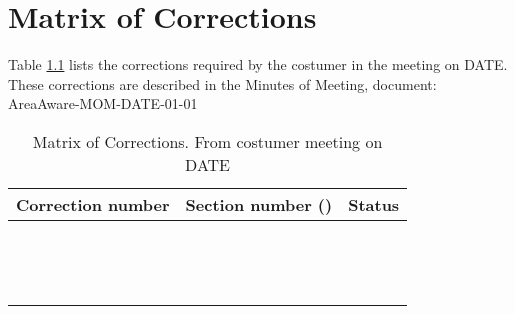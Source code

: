\chapter{Matrix of Corrections}
\label{chp:matrix}

Table \ref{tb:MoC} lists the corrections required by the costumer in the meeting on DATE. These corrections are described in the Minutes of Meeting, document: AreaAware-MOM-DATE-01-01\\

\begin{table}[ht]
\centering
\begin{tabular}{|c|c|c|}
\hline Correction number & Section number () & Status \\ 
\hline  &  &  \\ 
\hline  &  &  \\ 
\hline  &  &  \\ 
\hline  &  &  \\ 
\hline  &  &  \\ 
\hline  &  &  \\ 
\hline  &  &  \\ 
\hline  &  &  \\ 
\hline  &  &  \\ 
\hline  &  &  \\ 
\hline  &  &  \\ 
\hline  &  &  \\ 
\hline  &  &  \\ 
\hline  &  &  \\ 
\hline 
\end{tabular}
\caption{Matrix of Corrections. From costumer meeting on DATE}
\label{tb:MoC} 
\end{table}